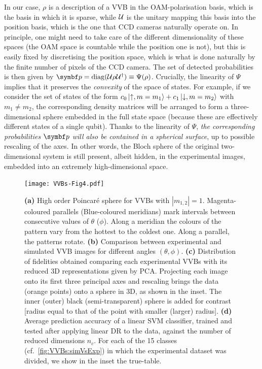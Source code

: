 In our case, $\rho$ is a description of a VVB in the OAM-polarisation basis, which is the basis in which it is sparse, while ${\mathcal{U}}$ is the unitary mapping this basis into the position basis, which is the one that CCD cameras naturally operate on. In principle, one might need to take care of the different dimensionality of these spaces (the OAM space is countable while the position one is not), but this is easily fixed by discretising the position space, which is what is done naturally by the finite number of pixels of the CCD camera. 
The set of detected probabilities is then given by $\bs p=\on{diag}(\calU\rho\calU^\dagger)\equiv\Psi(\rho)$.
Crucially, the linearity of $\Psi$ implies that it preserves the \emph{convexity} of the space of states.
For example, if we consider the set of states of the form $c_0 \ket{\uparrow,m=m_1} + c_1 \ket{\downarrow,m=m_2}$ with $m_1\neq m_2$, the corresponding density matrices will be arranged to form a three-dimensional sphere embedded in the full state space (because these are effectively different states of a single qubit).
Thanks to the linearity of $\Psi$, \emph{the corresponding probabilities $\bs p$ will also be contained in a spherical surface}, up to possible rescaling of the axes.
In other words, the Bloch sphere of the original two-dimensional system is still present, albeit hidden, in the experimental images, embedded into an extremely high-dimensional space.


\begin{figure}[tb]
    \centering
    \texttt{[image: VVBs-Fig4.pdf]}
    \caption{
		\textbf{(a)} High order Poincar\'e sphere for \acp{VVB} with $|m_{1,2}|=1$. Magenta-coloured parallels (Blue-coloured meridians) mark intervals between consecutive values of $\theta$ ($\phi$). 
		Along a meridian the colours of the pattern vary from the hottest to the coldest one. Along a parallel, the patterns rotate.
		\textbf{(b)}
		Comparison between experimental and simulated \ac{VVB} images for different angles $(\theta, \phi)$.
		\textbf{(c)}
		Distribution of fidelities obtained comparing each experimental VVBs with its reduced 3D representations given by PCA. Projecting each image onto its first three principal axes and rescaling brings the data (orange points) onto a sphere in 3D, as shown in the inset. The inner (outer) black (semi-transparent) sphere is added for contrast [radius equal to that of the point with smaller (larger) radius]. 
		\textbf{(d)}
		Average prediction accuracy of a linear \ac{SVM} classifier, trained and tested after applying linear DR to the data, against the number of reduced dimensions $n_c$.
		For each of the 15 classes (cf.~\cref{fig:VVBs:simVsExp}) in which the experimental dataset was divided, we show in the inset the true-table. 
    }%
    \label{fig:VVBs:PCAresults}
\end{figure}


